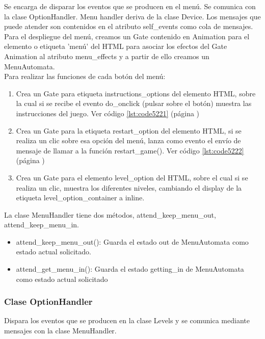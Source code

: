Se encarga de disparar los eventos que se producen en el menú. Se comunica con la clase OptionHandler.
Menu handler deriva de la clase Device. Los mensajes que puede atender son contenidos en el atributo self\_events como cola de mensajes.\\

Para el despliegue del menú, creamos un Gate contenido en Animation para el elemento o etiqueta 'menú' del HTML para asociar los efectos del 
Gate Animation al atributo menu\_effects y a partir de ello creamos un MenuAutomata.\\

Para realizar las funciones de cada botón del menú:
\begin{enumerate}
 \item Crea un Gate  para etiqueta instructions\_options del elemento HTML, sobre la cual si se recibe el 
evento do\_onclick (pulsar sobre el botón) muestra las instrucciones del juego. Ver código \ref{lst:code5221} (página \pageref{lst:code5221})

 \item Crea un Gate para la etiqueta restart\_option del elemento HTML, si se realiza un clic sobre esa opción del menú, lanza como evento el envío 
de mensaje de llamar a la función restart\_game(). Ver código \ref{lst:code5222} (página \pageref{lst:code5222})

 \item Crea un Gate para el elemento level\_option del HTML, sobre el cual si se realiza un clic,
muestra los diferentes niveles, cambiando el display de la etiqueta level\_option\_container a inline.
\end{enumerate}

La clase MenuHandler tiene dos métodos, attend\_keep\_menu\_out, attend\_keep\_menu\_in.
\begin{itemize}
 \item attend\_keep\_menu\_out(): Guarda el estado out de MenuAutomata como estado actual solicitado.

 \item attend\_get\_menu\_in(): Guarda el estado getting\_in de MenuAutomata como estado actual solicitado
\end{itemize}

\subsubsection{Clase OptionHandler}
\label{subsubsection:option_handler}

Dispara los eventos que se producen en la clase Levels y se comunica mediante mensajes con la clase MenuHandler.

